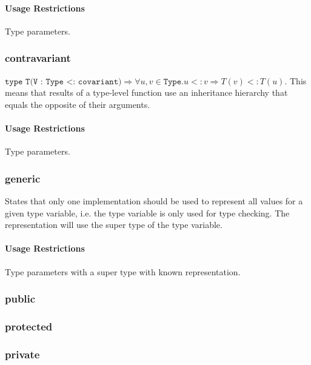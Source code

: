 \paragraph{Usage Restrictions}
Type parameters.


\subsubsection{contravariant}

$\texttt{type T(V : Type <: covariant)} \Rightarrow \forall u,v \in \texttt{Type}. u <: v \Rightarrow T(v) <: T(u)$.
This means that results of a type-level function use an inheritance hierarchy that equals the opposite of their arguments.

\paragraph{Usage Restrictions}
Type parameters.


\subsubsection{generic}
States that only one implementation should be used to represent all values for a given type variable, i.e. the type variable is only used for type checking.
The representation will use the super type of the type variable.

\paragraph{Usage Restrictions}
Type parameters with a super type with known representation.

\subsubsection{public}
\subsubsection{protected}
\subsubsection{private}

